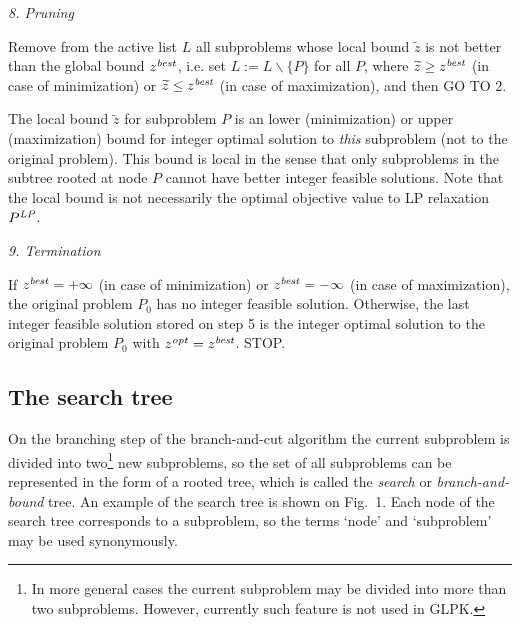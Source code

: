 {\it 8. Pruning}

Remove from the active list $L$ all subproblems whose local bound
$\widetilde{z}$ is not better than the global bound $z^{\it best}$,
i.e. set $L:=L\backslash\{P\}$ for all $P$, where
$\widetilde{z}\geq z^{\it best}$ (in case of minimization) or
$\widetilde{z}\leq z^{\it best}$ (in case of maximization), and then
GO TO 2.

The local bound $\widetilde{z}$ for subproblem $P$ is an lower
(minimization) or upper (maximization) bound for integer optimal
solution to {\it this} subproblem (not to the original problem). This
bound is local in the sense that only subproblems in the subtree rooted
at node $P$ cannot have better integer feasible solutions. Note that
the local bound is not necessarily the optimal objective value to LP
relaxation $P^{\it LP}$.

{\it 9. Termination}

If $z^{\it best}=+\infty$ (in case of minimization) or
$z^{\it best}=-\infty$ (in case of maximization), the original problem
$P_0$ has no integer feasible solution. Otherwise, the last integer
feasible solution stored on step 5 is the integer optimal solution to
the original problem $P_0$ with $z^{\it opt}=z^{\it best}$. STOP.

\subsection{The search tree}

On the branching step of the branch-and-cut algorithm the current
subproblem is divided into two\footnote{In more general cases the
current subproblem may be divided into more than two subproblems.
However, currently such feature is not used in GLPK.} new subproblems,
so the set of all subproblems can be represented in the form of a rooted
tree, which is called the {\it search} or {\it branch-and-bound} tree.
An example of the search tree is shown on Fig.~1. Each node of the
search tree corresponds to a subproblem, so the terms `node' and
`subproblem' may be used synonymously.

